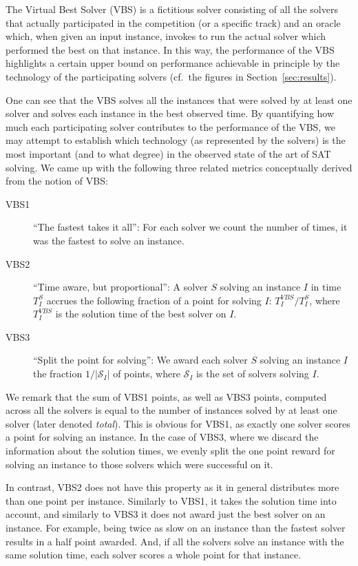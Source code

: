\documentclass{elsarticle}
\begin{document}
The Virtual Best Solver (VBS) is a fictitious solver consisting 
of all the solvers that actually participated in the competition (or a specific track)
and an oracle which, when given an input instance,
invokes to run the actual solver which performed the best on that instance.
In this way, the performance of the VBS highlights a certain upper bound 
on performance achievable in principle by the technology 
of the participating solvers (cf.~the figures in Section~\ref{sec:results}). 

One can see that the VBS solves all the instances that
were solved by at least one solver and solves each instance in the best observed time.
By quantifying how much each participating solver contributes
to the performance of the VBS, we may attempt to establish which
technology (as represented by the solvers) is the most important
(and to what degree) in the observed state of the art of SAT solving.
We came up with the following three related metrics conceptually derived
from the notion of VBS:
\begin{description}
\item[VBS1]
``The fastest takes it all'':
For each solver we count the number of times, it was the fastest to solve an instance.
\item[VBS2]
``Time aware, but proportional'':
A solver $S$ solving an instance $I$ in time $T^S_I$ accrues 
the following fraction of a point for solving $I$:
$T^\mathit{VBS}_I/T^S_I$, where $T^\mathit{VBS}_I$ is the solution time of the best solver on $I$.
\item[VBS3]
``Split the point for solving'':
We award each solver $S$ solving an instance $I$ the fraction $1/|\mathcal{S}_I|$ of points, where
$\mathcal{S}_I$ is the set of solvers solving $I$.
\end{description}
We remark that the sum of VBS1 points, as well as VBS3 points, computed across all the solvers
is equal to the number of instances solved by at least one solver (later denoted \emph{total}).
This is obvious for VBS1, as exactly one solver scores a point for solving an instance.
In the case of VBS3, where we discard the information about the solution times, 
we evenly split the one point reward for solving an instance to those solvers which were successful on it.

In contrast, VBS2 does not have this property as it in general distributes more than one point per instance.
Similarly to VBS1, it takes the solution time into account,
and similarly to VBS3 it does not award just the best solver on an instance.
For example, being twice as slow on an instance than the fastest solver results in a half point awarded.
And, if all the solvers solve an instance with the same solution time,
each solver scores a whole point for that instance. 
\end{document}
